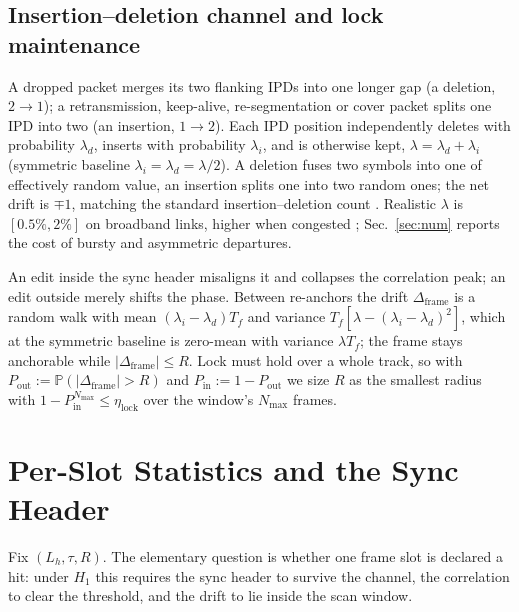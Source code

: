\documentclass[journal]{IEEEtran}
\newcommand{\Tf}{T_f}
\newcommand{\Nmax}{N_{\max}}
\newcommand{\Lh}{L_h}
\newcommand{\Prob}{\mathbb{P}}
\begin{document}
\subsection{Insertion--deletion channel and lock maintenance}
A dropped packet merges its two flanking IPDs into one longer gap (a deletion, $2\to1$); a retransmission, keep-alive, re-segmentation or cover packet splits one IPD into two (an insertion, $1\to2$). Each IPD position independently deletes with probability $\lambda_d$, inserts with probability $\lambda_i$, and is otherwise kept, $\lambda=\lambda_d+\lambda_i$ (symmetric baseline $\lambda_i=\lambda_d=\lambda/2$). A deletion fuses two symbols into one of effectively random value, an insertion splits one into two random ones; the net drift is $\mp1$, matching the standard insertion--deletion count \cite{Mitzenmacher2009Survey}. Realistic $\lambda$ is $[0.5\%,2\%]$ on broadband links, higher when congested \cite{Paxson1999E2E,Bennett1999Reorder}; Sec.~\ref{sec:num} reports the cost of bursty and asymmetric departures.

An edit inside the sync header misaligns it and collapses the correlation peak; an edit outside merely shifts the phase. Between re-anchors the drift $\Delta_{\mathrm{frame}}$ is a random walk with mean $(\lambda_i-\lambda_d)\Tf$ and variance $\Tf[\lambda-(\lambda_i-\lambda_d)^2]$, which at the symmetric baseline is zero-mean with variance $\lambda\Tf$; the frame stays anchorable while $|\Delta_{\mathrm{frame}}|\le R$. Lock must hold over a whole track, so with $P_{\mathrm{out}}:=\Prob(|\Delta_{\mathrm{frame}}|>R)$ and $P_{\mathrm{in}}:=1-P_{\mathrm{out}}$ we size $R$ as the smallest radius with $1-P_{\mathrm{in}}^{\Nmax}\le\eta_{\mathrm{lock}}$ over the window's $\Nmax$ frames.

\section{Per-Slot Statistics and the Sync Header}
\label{sec:analysis}

Fix $(\Lh,\tau,R)$. The elementary question is whether one frame slot is declared a hit: under $H_1$ this requires the sync header to survive the channel, the correlation to clear the threshold, and the drift to lie inside the scan window.
\end{document}
